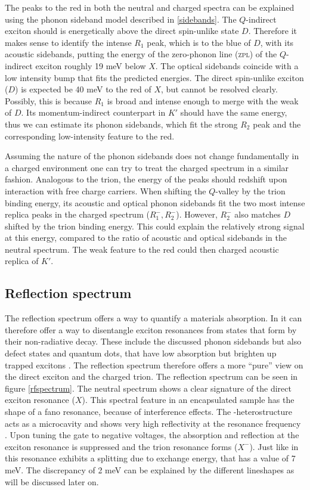 The peaks to the red in both the neutral and charged spectra can be explained using the phonon sideband model described in \ref{sidebands}. The $Q$-indirect exciton should is energetically above the direct spin-unlike state $D$. Therefore it makes sense to identify the intense $R_1$ peak, which is to the blue of $D$, with its acoustic sidebands, putting the energy of the zero-phonon line (\textsc{zpl}) of the $Q$-indirect exciton roughly 19  meV below $X$. The optical sidebands coincide with a low intensity bump that fits the predicted energies. The direct spin-unlike exciton ($D$) is expected be 40 meV to the red of $X$, but cannot be resolved clearly. Possibly, this is because $R_1$ is broad and intense enough to merge with the weak \pl of $D$. Its momentum-indirect counterpart in $K'$ should have the same energy, thus we can estimate its phonon sidebands, which fit the strong $R_2$ peak and the corresponding low-intensity feature to the red.

Assuming the nature of the phonon sidebands does not change fundamentally in a charged environment one can try to treat the charged spectrum in a similar fashion. Analogous to the trion, the energy of the peaks should redshift upon interaction with free charge carriers. When shifting the $Q$-valley by the trion binding energy, its acoustic and optical phonon sidebands fit the two most intense replica peaks in the charged spectrum ($R^-_1, R^-_2$). However, $R^-_2$ also matches $D$ shifted by the trion binding energy. This could explain the relatively strong signal at this energy, compared to the ratio of acoustic and optical sidebands in the neutral spectrum. The weak feature to the red could then charged acoustic replica of $K'$. 

\subsection{Reflection spectrum}

The reflection spectrum offers a way to quantify a materials absorption. In \tmds it can therefore offer a way to disentangle exciton resonances from states that form by their non-radiative decay. These include the discussed phonon sidebands but also defect states and quantum dots, that have low absorption but brighten up trapped excitons \cite{srivastava_optically_2015}. The reflection spectrum therefore offers a more ``pure'' view on the direct exciton and the charged trion.
The reflection spectrum can be seen in figure \ref{rfspectrum}. The neutral spectrum shows a clear signature of the direct exciton resonance ($X$). This spectral feature in an \hbng encapsulated sample has the shape of a fano resonance, because of interference effects. The \tmd-\hbng heterostructure acts as a microcavity and shows very high reflectivity at the resonance frequency \cite{scuri_large_2018}. Upon tuning the gate to negative voltages, the absorption and reflection at the exciton resonance is suppressed and the trion resonance forms ($X^-$). Just like in \pl this resonance exhibits a splitting due to exchange\cite{courtade_charged_2017} energy, that has a value of 7 meV. The discrepancy of 2 meV can be explained by the different lineshapes as will be discussed later on. 

